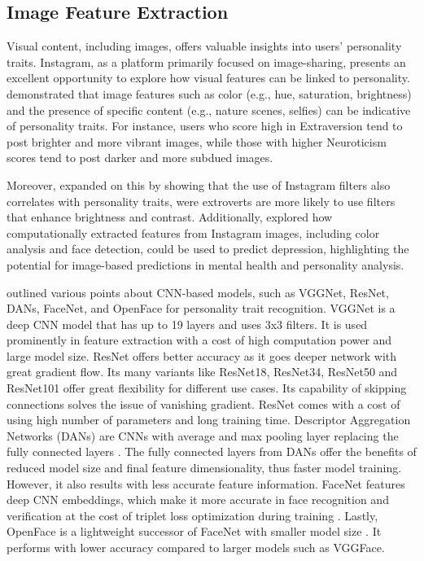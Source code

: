 \subsection{Image Feature Extraction}

Visual content, including images, offers valuable insights into users' personality traits. Instagram, as a platform primarily focused on image-sharing, presents an excellent opportunity to explore how visual features can be linked to personality. \citet{Ferwerda2018} demonstrated that image features such as color (e.g., hue, saturation, brightness) and the presence of specific content (e.g., nature scenes, selfies) can be indicative of personality traits. For instance, users who score high in Extraversion tend to post brighter and more vibrant images, while those with higher Neuroticism scores tend to post darker and more subdued images.

Moreover, \citet{Branz2020} expanded on this by showing that the use of Instagram filters also correlates with personality traits, were extroverts are more likely to use filters that enhance brightness and contrast. Additionally, \citet{Reece2017} explored how computationally extracted features from Instagram images, including color analysis and face detection, could be used to predict depression, highlighting the potential for image-based predictions in mental health and personality analysis.

\citet{Amin_Sjarif_Yuhaniz_2025} outlined various points about CNN-based models, such as VGGNet, ResNet, DANs, FaceNet, and OpenFace for personality trait recognition. VGGNet is a deep CNN model that has up to 19 layers and uses 3x3 filters. It is used prominently in feature extraction with a cost of high computation power and large model size. ResNet offers better accuracy as it goes deeper network with great gradient flow. Its many variants like ResNet18, ResNet34, ResNet50 and ResNet101 offer great flexibility for different use cases. Its capability of skipping connections solves the issue of vanishing gradient. ResNet comes with a cost of using high number of parameters and long training time. Descriptor Aggregation Networks (DANs) are CNNs with average and max pooling layer replacing the fully connected layers \citep{Zhang_Zhang_Wei_Wu_2016}. The fully connected layers from DANs offer the benefits of reduced model size and final feature dimensionality, thus faster model training. However, it also results with less accurate feature information. FaceNet features deep CNN embeddings, which make it more accurate in face recognition and verification at the cost of triplet loss optimization during training \citep{Schroff_Kalenichenko_Philbin_2015}. Lastly, OpenFace is a lightweight successor of FaceNet with smaller model size \citep{Amos_Ludwiczuk_Satyanarayanan_2016}. It performs with lower accuracy compared to larger models such as VGGFace. 

